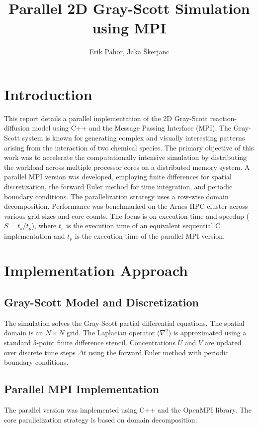 \documentclass[9pt]{IEEEtran} %
\title{\vspace{0ex}
Parallel 2D Gray-Scott Simulation using MPI}
\author{Erik Pahor, Jaka Škerjanc\vspace{-3.5ex}}
\begin{document}
\maketitle
\thispagestyle{empty} %

\section{Introduction}
\label{sec:introduction}

This report details a parallel implementation of the 2D Gray-Scott reaction-diffusion model using C++ and the Message Passing Interface (MPI). The Gray-Scott system is known for generating complex and visually interesting patterns arising from the interaction of two chemical species. The primary objective of this work was to accelerate the computationally intensive simulation by distributing the workload across multiple processor cores on a distributed memory system. A parallel MPI version was developed, employing finite differences for spatial discretization, the forward Euler method for time integration, and periodic boundary conditions. The parallelization strategy uses a row-wise domain decomposition. Performance was benchmarked on the Arnes HPC cluster across various grid sizes and core counts. The focus is on execution time and speedup ($S=t_s/t_p$), where $t_s$ is the execution time of an equivalent sequential C implementation and $t_p$ is the execution time of the parallel MPI version.

\section{Implementation Approach}
\label{sec:implementation}

\subsection{Gray-Scott Model and Discretization}
The simulation solves the Gray-Scott partial differential equations. The spatial domain is an $N \times N$ grid. The Laplacian operator ($\nabla^2$) is approximated using a standard 5-point finite difference stencil. Concentrations $U$ and $V$ are updated over discrete time steps $\Delta t$ using the forward Euler method with periodic boundary conditions.

\subsection{Parallel MPI Implementation}
The parallel version was implemented using C++ and the OpenMPI library. The core parallelization strategy is based on domain decomposition:
\end{document}
